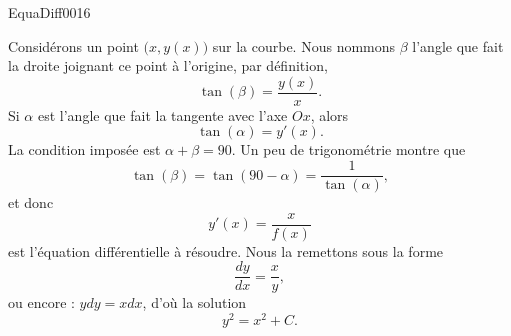 \begin{corrige}{EquaDiff0016}


%
Considérons un point $\big( x,y(x) \big)$ sur la courbe. Nous nommons $\beta$ l'angle que fait la droite joignant ce point à l'origine, par définition,
\begin{equation}
	\tan(\beta)=\frac{ y(x) }{ x }.
\end{equation}
Si $\alpha$ est l'angle que fait la tangente avec l'axe $Ox$, alors 
\begin{equation}
	\tan(\alpha)=y'(x).
\end{equation}
La condition imposée est $\alpha+\beta=90$. Un peu de trigonométrie montre que
\begin{equation}
	\tan(\beta)=\tan(90-\alpha)=\frac{1}{ \tan(\alpha) },
\end{equation}
et donc
\begin{equation}
	y'(x)=\frac{ x }{ f(x) }
\end{equation}
est l'équation différentielle à résoudre. Nous la remettons sous la forme
\begin{equation}
	\frac{ dy }{ dx }=\frac{ x }{ y }, 
\end{equation}
ou encore : $ydy=xdx$, d'où la solution
\begin{equation}
	y^2=x^2+C.
\end{equation}


\end{corrige}
